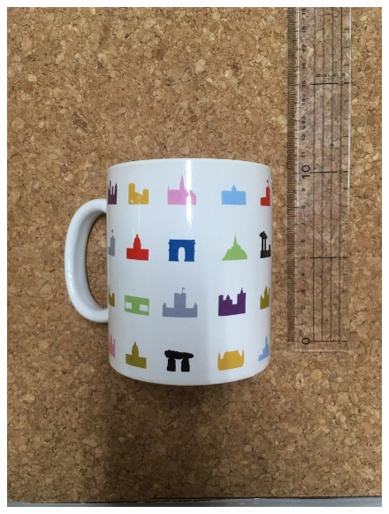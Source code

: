 \begin{figure}[H]
\begin{minipage}{0.19\columnwidth}
        \includegraphics[clip, width=\linewidth]{figure/chapter4/cup}
    \end{minipage}
    \begin{minipage}{0.19\columnwidth}
        \centering

\end{minipage}
\end{figure}
